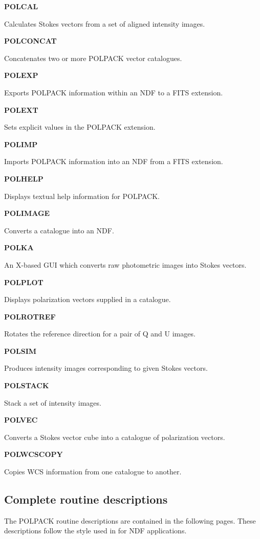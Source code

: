 \documentclass[twoside,11pt]{starlink}
\providecommand{\quickdes}[3]{
                         \parbox{1.1in}{\textbf{#1}}
                         \parbox{4.4in}{\raggedright #2 \dotfill}
                         \parbox{0.6in}{\pageref{#3}}
                         \vspace*{0.2in}}
\begin{document}
\quickdes{POLCAL}{Calculates Stokes vectors from a set of aligned intensity images.}{POLCAL}

\quickdes{POLCONCAT}{Concatenates two or more POLPACK vector catalogues.}{POLCONCAT}

\quickdes{POLEXP}{Exports POLPACK information within an NDF to a FITS extension.}{POLEXP}

\quickdes{POLEXT}{Sets explicit values in the POLPACK extension.}{POLEXT}

\quickdes{POLIMP}{Imports POLPACK information into an NDF from a FITS
extension.}{POLEXP}

\quickdes{POLHELP}{Displays textual help information for POLPACK.}{POLHELP}

\quickdes{POLIMAGE}{Converts a catalogue into an NDF.}{POLIMAGE}

\quickdes{POLKA}{An X-based GUI which converts raw photometric images
into Stokes vectors.}{POLKA}

\quickdes{POLPLOT}{Displays polarization vectors supplied in a
catalogue.}{POLPLOT}

\quickdes{POLROTREF}{Rotates the reference direction for a pair of Q and
U images.}{POLROTREF}

\quickdes{POLSIM}{Produces intensity images corresponding to given Stokes
vectors.}{POLSIM}

\quickdes{POLSTACK}{Stack a set of intensity images.}{POLSTACK}

\quickdes{POLVEC}{Converts a Stokes vector cube into a catalogue of
polarization vectors.}{POLVEC}

\quickdes{POLWCSCOPY}{Copies WCS information from one catalogue to
another.}{POLWCSCOPY}

\subsection{Complete routine descriptions \label{descriptions}}

The POLPACK routine descriptions are contained in the following pages.
These descriptions follow the style used in 
for NDF applications.
\end{document}
